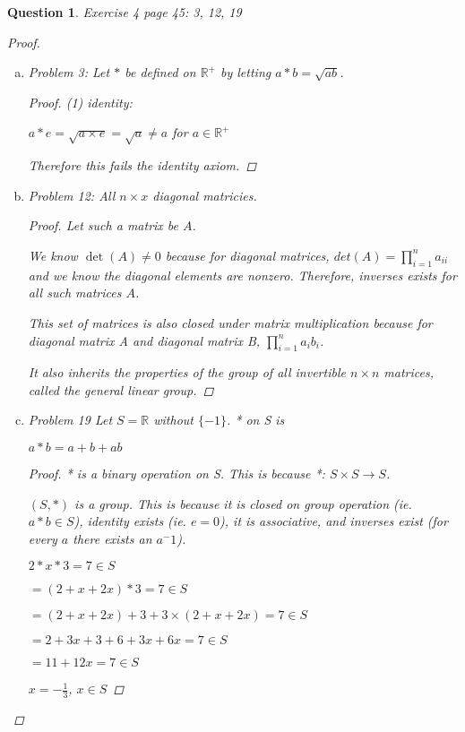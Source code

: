 \documentclass{article}
\newcommand*{\field}[1]{\mathbb{#1}}%
\newtheorem{ques}{Question}
\begin{document}
\begin{ques} 
	Exercise 4 page 45: 3, 12, 19	
	\begin{proof}
		\begin{enumerate}[(a)]
			
			\item 
			Problem 3: Let $*$ be defined on $\field{R^+}$ by letting $a*b = \sqrt{ab}$.
			\begin{proof}
				(1)  identity: 
				
				$a * e = \sqrt{a \times e} = \sqrt{a} \neq a$ for $a \in \field{R}^+$
				
				Therefore this fails the identity axiom. 
			\end{proof}
			
			\item 
			Problem 12: All $n \times x$ diagonal matricies.

			\begin{proof}		
				Let such a matrix be $A$.
				
				We know $\det(A) \neq 0$ because for diagonal matrices, $det(A) = \prod_{i = 1}^{n} a_{ii}$ and we know the diagonal elements are nonzero. Therefore, inverses exists for all such matrices $A$.
				
				This set of matrices is also closed under matrix multiplication because for diagonal matrix A and diagonal matrix B, $\prod_{i = 1}^{n} a_{i}b_{i}$.
				
				It also inherits the properties of the group of all invertible $n \times n$ matrices, called the general linear group.
			\end{proof}
			
			\item 
			Problem 19 Let $S = \field{R}$ without $\{-1\}$. * on S is
			
			$a * b = a + b + ab$
			
			
			\begin{proof}
				
				* is a binary operation on S. This is because *: $S \times S \rightarrow S$.
				
				$(S, *)$  is a group. This is because it is closed on group operation (ie. $a * b \in S$), identity exists (ie. $e = 0$), it is associative, and inverses exist (for every $a$ there exists an $a^-1$).
				
				$2 * x * 3 = 7 \in S$
				
				
				$= (2 + x  + 2x) * 3 = 7 \in S$
				
				$= (2 + x  + 2x) + 3 + 3 \times (2 + x  + 2x) = 7 \in S$
				
				$= 2 + 3x + 3 + 6 + 3x + 6x = 7 \in S$
				
				$= 11 + 12x =  7 \in S$
				
				$x = -\frac{1}{3}$, $x \in S$
				
			\end{proof}
			
		\end{enumerate}
	\end{proof}
\end{ques}
\end{document}
